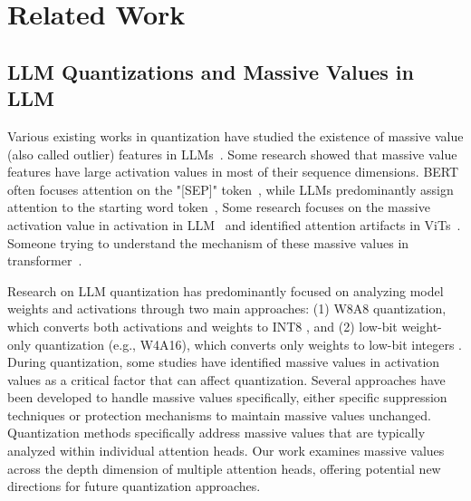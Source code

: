 \section{Related Work}
\subsection{LLM Quantizations and Massive Values in LLM}

Various existing works in quantization have studied the existence of massive value (also called outlier) features in LLMs~\citep{dettmers2022gpt3, ahmadian2023intriguing, guo2024activedormant}. Some research showed that massive value features have large activation values in most of their sequence dimensions. BERT often focuses attention on the "[SEP]" token~\citep{clark-etal-2019-bert, xiao2024efficient}, while LLMs predominantly assign attention to the starting word token~\citep{xiao2024efficient}, Some research focuses on the massive activation value in activation in LLM~\citep{sun2024massive} and identified attention artifacts in ViTs~\citep{darcet2024vision}. Someone trying to understand the mechanism of these massive values in transformer~\citep{guo2024activedormant}.

Research on LLM quantization has predominantly focused on analyzing model weights and activations through two main approaches: (1) W8A8 quantization, which converts both activations and weights to INT8 \citep{wei2022outlier, wei-etal-2023-outlier, xiao2023smoothquant, yao2022zeroquant, dettmers2022gpt3}, and (2) low-bit weight-only quantization (e.g., W4A16), which converts only weights to low-bit integers \citep{frantar-gptq, lin2023awq, sheng2023flexgen, park2024lut}. 
During quantization, some studies have identified massive values in activation values \citep{liukivi, sun2024massive} as a critical factor that can affect quantization. Several approaches have been developed to handle massive values specifically, either specific suppression techniques \citep{wei2022outlier, wei-etal-2023-outlier} or protection mechanisms \citep{lin2023awq, xiao2023smoothquant} to maintain massive values unchanged. Quantization methods specifically address massive values that are typically analyzed within individual attention heads. Our work examines massive values across the depth dimension of multiple attention heads, offering potential new directions for future quantization approaches.

